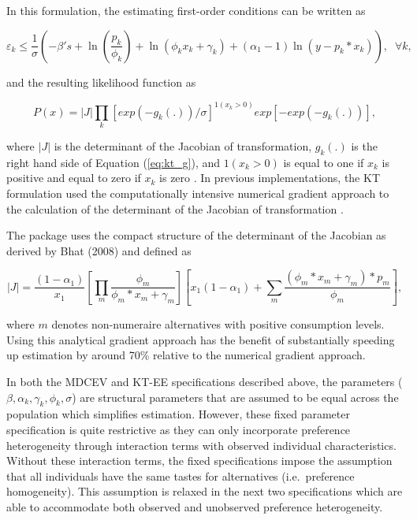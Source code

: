 In this formulation, the estimating first-order conditions can be
written as

\begin{equation}
\varepsilon_k \leq \frac{1}{\sigma}\left( -\beta' s + \ln(\frac{p_k}{\phi_k}) + \ln(\phi_k x_k + \gamma_k) + (\alpha_1 - 1)\ln (y - p_k * x_k) \right ), \; \; \forall k,
\label{eq:kt_g}
\end{equation}

and the resulting likelihood function as

\begin{equation}
P(x) = |J| \prod_k \left[exp(-g_k(.))/ \sigma \right]^{1(x_k>0)} exp[-exp(-g_k(.))],
\label{eq:ll_kt_ee}
\end{equation}

where \(|J|\) is the determinant of the Jacobian of transformation,
\(g_k(.)\) is the right hand side of Equation (\ref{eq:kt_g}), and
\(1(x_k>0)\) is equal to one if \(x_k\) is positive and equal to zero if
\(x_k\) is zero \citep{vonhaefenkuhn-tucker2005}. In previous
implementations, the KT formulation used the computationally intensive
numerical gradient approach to the calculation of the determinant of the
Jacobian of transformation \citep{vonhaefenkuhn-tucker2005}.

The  package uses the compact structure of the determinant
of the Jacobian as derived by Bhat (2008) and defined as

\begin{equation}
|J| = \frac{(1-\alpha_1)}{x_1} \left[ \prod_m \frac{\phi_m}{\phi_m * x_m + \gamma_m} \right] \left[ {x_1}{(1-\alpha_1)} + \sum_m \frac{(\phi_m * x_m + \gamma_m)* p_m}{\phi_m} \right],
\end{equation}

where \(m\) denotes non-numeraire alternatives with positive consumption
levels. Using this analytical gradient approach has the benefit of
substantially speeding up estimation by around 70\% relative to the
numerical gradient approach.

In both the MDCEV and KT-EE specifications described above, the
parameters (\(\beta, \alpha_k , \gamma_k, \phi_k, \sigma\)) are
structural parameters that are assumed to be equal across the population
which simplifies estimation. However, these fixed parameter
specification is quite restrictive as they can only incorporate
preference heterogeneity through interaction terms with observed
individual characteristics. Without these interaction terms, the fixed
specifications impose the assumption that all individuals have the same
tastes for alternatives (i.e.~preference homogeneity). This assumption
is relaxed in the next two specifications which are able to accommodate
both observed and unobserved preference heterogeneity.

